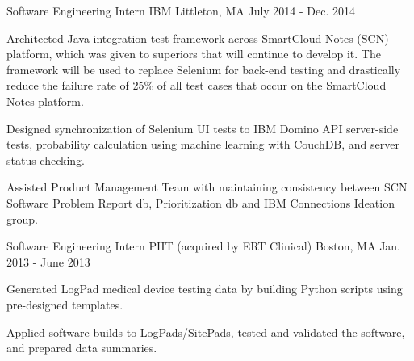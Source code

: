 \begin{cventries}
\vspace{5mm}
  \cventry
    {Software Engineering Intern} %
    {IBM} %
    {Littleton, MA} %
    {July 2014 - Dec. 2014} %
    {
      \begin{cvitems} %
        \item {Architected Java integration test framework across SmartCloud Notes (SCN) platform, which was given to superiors that will continue to develop it. The framework will be used to replace Selenium for back-end testing and drastically reduce the failure rate of 25\% of all test cases that occur on the SmartCloud Notes platform.}
        \item {Designed synchronization of Selenium UI tests to IBM Domino API server-side tests, probability calculation using machine learning with CouchDB, and server status checking.}
        \item {Assisted Product Management Team with maintaining consistency between SCN Software Problem Report db, Prioritization db and IBM Connections Ideation group.}
      \end{cvitems}
    }

\vspace{5mm}
  \cventry
    {Software Engineering Intern} %
    {PHT (acquired by ERT Clinical)} %
    {Boston, MA} %
    {Jan. 2013 - June 2013} %
    {
      \begin{cvitems} %
        \item {Generated LogPad medical device testing data by building Python scripts using pre-designed templates.}
        \item {Applied software builds to LogPads/SitePads, tested and validated the software, and prepared data summaries.}
      \end{cvitems}
    }

\end{cventries}